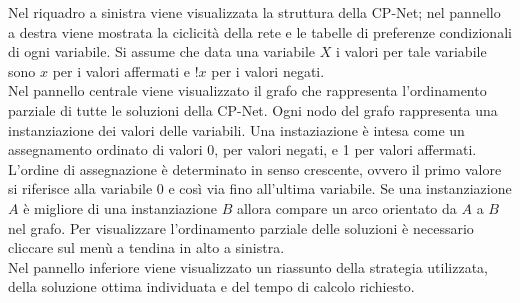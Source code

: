\documentclass[a4paper,titlepage]{article}
\begin{document}
Nel riquadro a sinistra viene visualizzata la struttura della CP-Net; nel pannello a destra viene mostrata la ciclicità della rete e le tabelle di preferenze condizionali di ogni variabile. Si assume che data una variabile $X$ i valori per tale variabile sono $x$ per i valori affermati e $!x$ per i valori negati.\\
Nel pannello centrale viene visualizzato il grafo che rappresenta l'ordinamento parziale di tutte le soluzioni della CP-Net. Ogni nodo del grafo rappresenta una instanziazione dei valori delle variabili. Una instaziazione è intesa come un assegnamento ordinato di valori 0, per valori negati, e 1 per valori affermati. L'ordine di assegnazione è determinato in senso crescente, ovvero il primo valore si riferisce alla variabile 0 e così via fino all'ultima variabile. Se una instanziazione $A$ è migliore di una instanziazione $B$ allora compare un arco orientato da $A$ a $B$ nel grafo. Per visualizzare l'ordinamento parziale delle soluzioni è necessario cliccare sul menù a tendina in alto a sinistra.\\
Nel pannello inferiore viene visualizzato un riassunto della strategia utilizzata, della soluzione ottima individuata e del tempo di calcolo richiesto.
\end{document}
